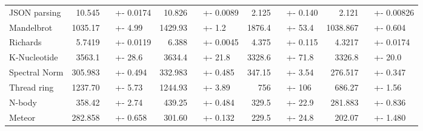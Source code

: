 \documentclass[preprint]{sigplanconf}
\begin{document}
\begin{table*}
\begin{tabular}{@{}lr@{}lr@{}lr@{}lr@{}l@{}}
JSON parsing & 10.545  ~ & +- 0.0174 & 10.826  ~ & +- 0.0089 & 2.125  ~ & +- 0.140 & 2.121  ~ & +- 0.00826 \\
Mandelbrot & 1035.17  ~ & +- 4.99 & 1429.93  ~ & +- 1.2 & 1876.4  ~ & +- 53.4 & 1038.867  ~ & +- 0.604 \\
Richards & 5.7419  ~ & +- 0.0119 & 6.388  ~ & +- 0.0045 & 4.375  ~ & +- 0.115 & 4.3217  ~ & +- 0.0174 \\
K-Nucleotide & 3563.1  ~ & +- 28.6 & 3634.4  ~ & +- 21.8 & 3328.6  ~ & +- 71.8 & 3326.8  ~ & +- 20.0 \\
Spectral Norm & 305.983  ~ & +- 0.494 & 332.983  ~ & +- 0.485 & 347.15  ~ & +- 3.54 & 276.517  ~ & +- 0.347 \\
Thread ring & 1237.70  ~ & +- 5.73 & 1244.93  ~ & +- 3.89 & 756  ~ & +- 106 & 686.27  ~ & +- 1.56 \\
N-body & 358.42  ~ & +- 2.74 & 439.25  ~ & +- 0.484 & 329.5  ~ & +- 22.9 & 281.883  ~ & +- 0.836 \\
Meteor & 282.858  ~ & +- 0.658 & 301.60  ~ & +- 0.132 & 229.5  ~ & +- 24.8 & 202.07  ~ & +- 1.480 \\
    \bottomrule
  \end{tabular}
  \label{tbl:benchmark}
\end{table*}






%
%
\end{document}
